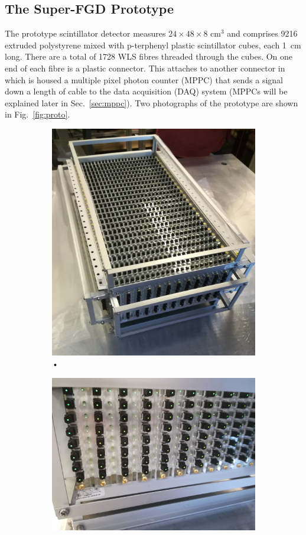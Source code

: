 \documentclass[aps,pra,12pt,notitlepage,tightenlines]{revtex4-1}
\begin{document}
\subsection{The Super-FGD Prototype}
The prototype scintillator detector measures $24\times48\times8$ cm$^3$ and comprises 9216 extruded polystyrene mixed with p-terphenyl plastic scintillator cubes, each 1~cm long. There are a total of 1728 WLS fibres threaded through the cubes. On one end of each fibre is a  plastic connector. This attaches to another connector in which is housed a multiple pixel photon counter (MPPC) that sends a signal down a length of cable to the data acquisition (DAQ) system (MPPCs will be explained later in Sec.\ \ref{sec:mppc}). Two photographs of the prototype are shown in Fig.\ \ref{fig:proto}.
 \begin{figure}
  \centering
  \begin{subfigure}{.5\textwidth}
   \centering
   \includegraphics[width=.7\linewidth]{proto}
   \caption{•}
   \label{fig:protoa}
  \end{subfigure}%
  \begin{subfigure}{.5\textwidth}
   \centering
   \includegraphics[width=.8\linewidth]{side}

\end{subfigure}
\end{figure}
\end{document}
